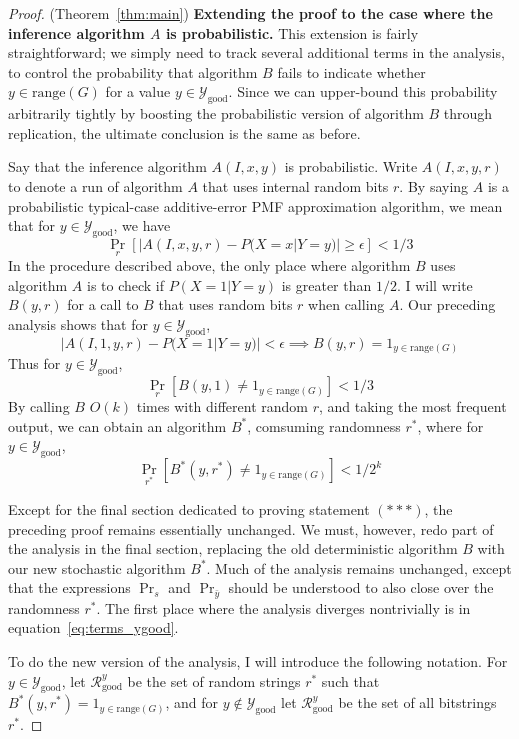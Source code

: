 \documentclass{article}
\def \Ygood{\mathcal{Y}_\text{good}}
\def \Rgood{\mathcal{R}_\text{good}}
\def \by{{\bar{y}}}
\theoremstyle{definition}
\theoremstyle{remark}
\begin{document}
\begin{proof}{(Theorem~\ref{thm:main})}
\medskip
\noindent
\textbf{Extending the proof to the case where the inference algorithm $A$ is probabilistic.}
This extension is fairly straightforward; we simply need to track several additional terms in the analysis, to control the probability that algorithm $B$ fails to indicate whether $y \in \text{range}(G)$ for a value $y \in \Ygood$.
Since we can upper-bound this probability arbitrarily tightly by boosting the probabilistic version of algorithm $B$ through replication, the ultimate conclusion is the same as before.

Say that the inference algorithm $A(I, x, y)$ is probabilistic.
Write $A(I, x, y, r)$ to denote a run of algorithm $A$ that uses internal random bits $r$.
By saying $A$ is a probabilistic typical-case additive-error PMF approximation algorithm, we mean that for $y \in \Ygood$, we have
$$
\Pr_r [|A(I, x, y, r) - P(X = x | Y = y)| \geq \epsilon] < 1/3
$$
In the procedure described above, the only place where algorithm $B$ uses algorithm $A$ is to check if $P(X = 1 | Y = y)$ is greater than $1/2$.
I will write $B(y, r)$ for a call to $B$ that uses random bits $r$ when calling $A$.
Our preceding analysis shows that for $y \in \Ygood$,
$$
|A(I, 1, y, r) - P(X = 1 | Y = y)| < \epsilon \implies  B(y, r) = 1_{y \in \text{range}(G)}
$$
Thus for $y \in \Ygood$,
$$
\Pr_r [B(y, 1) \neq 1_{y \in \text{range}(G)}] < 1/3
$$
By calling $B$ $O(k)$ times with different random $r$, and taking the most frequent output, we can obtain an algorithm $B^*$, comsuming randomness $r^*$, where for $y \in \Ygood$,
$$
\Pr_{r^*} [B^*(y, r^*) \neq 1_{y \in \text{range}(G)}] < 1/2^k
$$

Except for the final section dedicated to proving statement $(***)$, the preceding proof remains essentially unchanged.
We must, however, redo part of the analysis in the final section, replacing the old deterministic algorithm $B$ with our new stochastic algorithm $B^*$.
Much of the analysis remains unchanged, except that
the expressions $\Pr_s$ and $\Pr_\by$ should be understood to also close over the randomness $r^*$.
The first place where the analysis diverges nontrivially is in equation~\ref{eq:terms_ygood}.

To do the new version of the analysis, I will introduce the following notation. For $y \in \Ygood$, let $\Rgood^y$ be the set of random strings $r^*$ such that $B^*(y, r^*) = 1_{y \in \text{range}(G)}$,
and for $y \notin \Ygood$ let $\Rgood^y$ be the set of all bitstrings $r^*$.


\end{proof}
\end{document}

